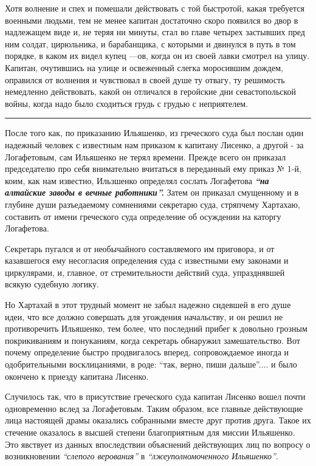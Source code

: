 \documentclass[a4paper,20pt]{report}
\begin{document}
Хотя волнение и спех и помешали действовать с той
быстротой, какая требуется военными людьми, тем не менее
капитан достаточно скоро появился во двор в надлежащем виде и, не теряя ни
минуты, стал во главе четырех застывших пред ним солдат, цирюльника, и
барабанщика, с которыми и двинулся в путь в том порядке, в каком их видел
купец —ов, когда он из своей лавки смотрел на улицу. Капитан, очутившись на
улице и освеженный слегка моросившим дождем, оправился от волнения и чувствовал
в своей душе ту отвагу, ту решимость немедленно действовать, какой он отличался
в геройские дни севастопольской войны, когда надо было сходиться грудь с грудью
с неприятелем.

\par\noindent\rule{\textwidth}{0.4pt}

После того как, по приказанию Ильяшенко, из греческого суда 
был послан один надежный человек с
известным нам приказом к капитану Лисенко, а другой - за Логафетовым, 
сам Ильяшенко не терял времени. Прежде всего он приказал председателю про себя
внимательно вчитаться в переданный ему приказ № 1-й,
коим, как нам известно, Ильзшенко определял сослать
Логафетова \textbf{\em ``на алтайские заводы в вечные работники''.} 
Затем он приказал смущенному и в глубине души 
разъедаемому сомнениями секретарю суда, стряпчему Хартахаю,
составить от имени греческого суда определение об осуждении на каторгу Логафетова.

Секретарь пугался и от необычайного составляемого
им приговора, и от казавшегося ему несогласия определения суда с известными
ему законами и циркулярами, и, главное, от стремительности действий суда, упразднявшей всякую судебную
логику.

Но Хартахай в этот трудный момент не забыл
надежно сидевшей в его душе идеи, что все должно совершать для угождения начальству,
и он решил не противоречить Ильяшенко, тем более, что последний прибег
к довольно грозным покрикиваниям и понуканиям, когда
секретарь обнаружил замешательство. Вот почему определение быстро продвигалось вперед,
сопровождаемое иногда и одобрительными восклицаниями, в роде: ``так, верно,
пиши дальше''.... и было окончено к приезду капитана Лисенко.

Случилось так, что в присутствие греческого суда капитан Лисенко вошел почти
одновременно вслед за Логафетовым. Таким образом, все главные действующие лица
настоящей драмы оказались собранными вместе друг против друга. Такое их
стечение оказалось в высшей степени благоприятным для миссии Ильяшенко.
Это явствует из данных впоследствии объяснений действующих лиц по вопросу о возникновении \emph{``слепого верования''}
в \emph{``лжеуполномоченного Ильяшенко''}.
\end{document}
